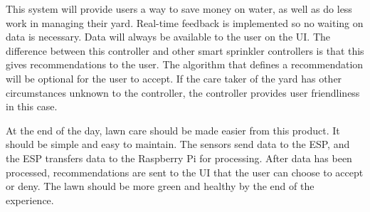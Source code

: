 \documentclass[letterpaper, 10 pt, conference]{ieeeconf}  %
\begin{document}
This system will provide users a way to save money on water, as well as do less work in managing their yard. Real-time feedback is implemented so no waiting on data is necessary. Data will always be available to the user on the UI. The difference between this controller and other smart sprinkler controllers is that this gives recommendations to the user. The algorithm that defines a recommendation will be optional for the user to accept. If the care taker of the yard has other circumstances unknown to the controller, the controller provides user friendliness in this case. 

At the end of the day, lawn care should be made easier from this product. It should be simple and easy to maintain. The sensors send data to the ESP, and the ESP transfers data to the Raspberry Pi for processing. After data has been processed, recommendations are sent to the UI that the user can choose to accept or deny. The lawn should be more green and healthy by the end of the experience. 





\end{document}

